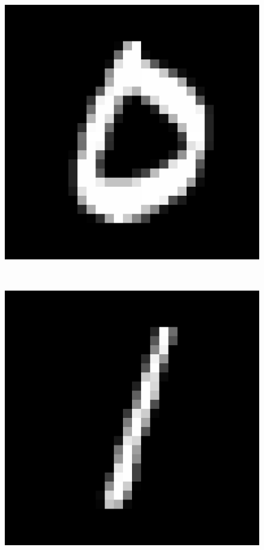\begin{figure}
\begin{minipage}{0.2\textwidth}
        \end{minipage}
        \begin{minipage}{0.2\textwidth}
            \centering
            \includegraphics[width=0.95\linewidth]{c3_figures/samples/euclid_12516_0.png}
        \end{minipage} \\
        \vspace{.2cm}
        \centering
        \begin{minipage}{0.2\textwidth}
            \centering
            \includegraphics[width=0.95\linewidth]{c3_figures/samples/original_1.png}

\end{minipage}
\end{figure}
